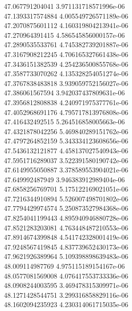 {47.067791204041 3.971131718571996e-06 \\
47.1393317574884 4.005549726571189e-06 \\
47.2070875601112 4.160319804213941e-06 \\
47.270964391415 4.586545856000157e-06 \\
47.2890535533761 4.745382739201887e-06 \\
47.3167908212245 4.706165327661438e-06 \\
47.3436151382539 4.254236500855768e-06 \\
47.3587733070262 4.135328254051274e-06 \\
47.3767838483818 3.939059752156027e-06 \\
47.386061567594 3.942037437809631e-06 \\
47.3956812808838 4.240971975377761e-06 \\
47.4052968691176 4.795717813976808e-06 \\
47.416432492515 5.264516858005663e-06 \\
47.4321878042256 5.469840289151762e-06 \\
47.4797264852159 5.343334123608656e-06 \\
47.5436132121877 4.458137027540943e-06 \\
47.5951716289037 3.522391580190742e-06 \\
47.6149955050887 3.378589553904021e-06 \\
47.649992487949 3.946383912989404e-06 \\
47.6858256769701 5.175122169021051e-06 \\
47.7216344910894 5.526007498701802e-06 \\
47.7794429974574 5.250873527984368e-06 \\
47.8254041199443 4.895940946880728e-06 \\
47.8521283203081 4.763448487210553e-06 \\
47.8914674399848 4.541742328001419e-06 \\
47.9248567419845 4.837739652430173e-06 \\
47.9621926389964 5.109398898639483e-06 \\
48.009114987769 4.975115189154167e-06 \\
48.0577081569008 4.076417553733336e-06 \\
48.0908244003595 3.469478315309971e-06 \\
48.1271428544751 3.299316858829116e-06 \\
48.1602094235923 4.230314061715035e-06 \\
}
